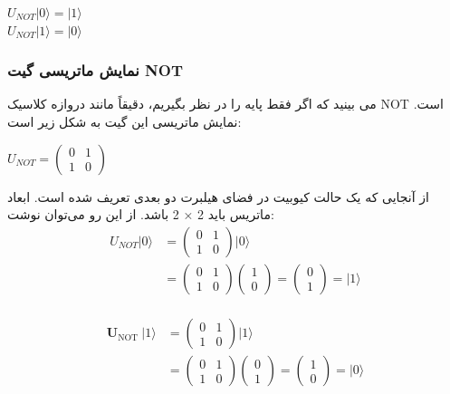 \documentclass{book}
\begin{document}
\begin{center}
	$U_{NOT}\vert0\rangle = \vert1\rangle$\\
	$U_{NOT}\vert1\rangle = \vert0\rangle$
\end{center}


\subsubsection{نمایش ماتریسی گیت NOT}

می بینید که اگر فقط پایه را در نظر بگیریم، دقیقاً مانند دروازه کلاسیک NOT است. نمایش ماتریسی این گیت به شکل زیر است:
\begin{center}
	$U_{NOT} =
	 \begin{pmatrix}
	 	0 & 1\\
	 	1 & 0
		\end{pmatrix}$
\end{center}
\pagebreak

از آنجایی که یک حالت کیوبیت در فضای هیلبرت دو بعدی تعریف شده است. ابعاد ماتریس باید 2 × 2 باشد. از این رو می‌توان نوشت:
$$
\begin{aligned}
	U_{N O T}|0\rangle & =\left(\begin{array}{ll}
		0 & 1 \\
		1 & 0
	\end{array}\right)|0\rangle \\
	& =\left(\begin{array}{ll}
		0 & 1 \\
		1 & 0
	\end{array}\right)\left(\begin{array}{l}
		1 \\
		0
	\end{array}\right)=\left(\begin{array}{l}
		0 \\
		1
	\end{array}\right)=|1\rangle
\end{aligned}
$$\\

$$
\begin{aligned}
	\boldsymbol{U}_{\text {NOT }}|1\rangle & =\left(\begin{array}{ll}
		0 & 1 \\
		1 & 0
	\end{array}\right)|1\rangle \\
	& =\left(\begin{array}{ll}
		0 & 1 \\
		1 & 0
	\end{array}\right)\left(\begin{array}{l}
		0 \\
		1
	\end{array}\right)=\left(\begin{array}{l}
		1 \\
		0
	\end{array}\right)=|0\rangle
\end{aligned}
$$
\end{document}
